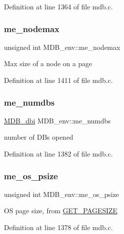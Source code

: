 Definition at line 1364 of file mdb.\+c.

\mbox{\label{struct_m_d_b__env_a718cafb69c2a74164b79a874f6aee9e0}} 
\subsubsection{\texorpdfstring{me\+\_\+nodemax}{me\_nodemax}}
{\footnotesize\ttfamily unsigned int M\+D\+B\+\_\+env\+::me\+\_\+nodemax}

Max size of a node on a page 

Definition at line 1411 of file mdb.\+c.

\mbox{\label{struct_m_d_b__env_ac34d9780c87bbf2d69bab073bb1964bd}} 
\subsubsection{\texorpdfstring{me\+\_\+numdbs}{me\_numdbs}}
{\footnotesize\ttfamily \mbox{\hyperlink{group__mdb_gadbe68a06c448dfb62da16443d251a78b}{M\+D\+B\+\_\+dbi}} M\+D\+B\+\_\+env\+::me\+\_\+numdbs}

number of D\+Bs opened 

Definition at line 1382 of file mdb.\+c.

\mbox{\label{struct_m_d_b__env_ae79524ce1389402e6c5065472b63a64d}} 
\subsubsection{\texorpdfstring{me\+\_\+os\+\_\+psize}{me\_os\_psize}}
{\footnotesize\ttfamily unsigned int M\+D\+B\+\_\+env\+::me\+\_\+os\+\_\+psize}

OS page size, from \mbox{\hyperlink{group__compat_ga948570910e2e84a556977f585cbfa2bf}{G\+E\+T\+\_\+\+P\+A\+G\+E\+S\+I\+ZE}} 

Definition at line 1378 of file mdb.\+c.

